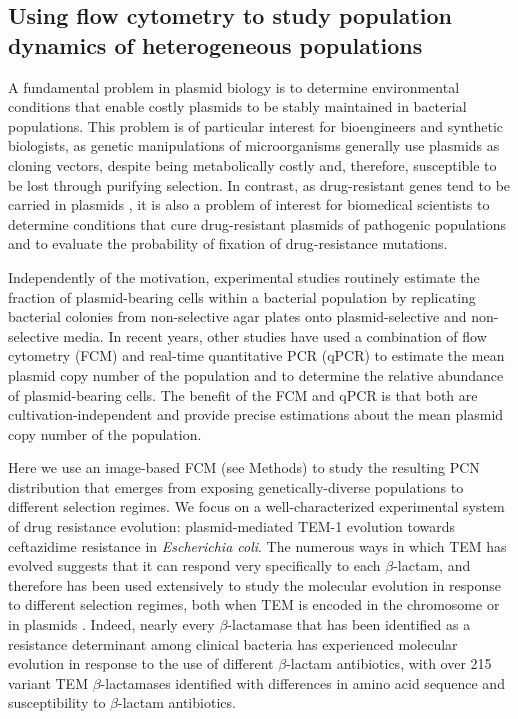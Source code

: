 \documentclass[fleqn,12pt]{wlscirep}
\begin{document}


\subsection{Using flow cytometry to study population dynamics of heterogeneous populations}
A fundamental problem in plasmid biology is to determine environmental conditions that enable costly plasmids to be stably maintained in bacterial populations\cite{Harrison2015,loftie2016evolutionary,porse2016survival}. This problem is of particular interest for bioengineers and synthetic biologists, as genetic manipulations of microorganisms generally use plasmids as cloning vectors, despite being metabolically costly and, therefore, susceptible to be lost through purifying selection.  In contrast, as drug-resistant genes tend to be carried in plasmids \cite{alekshun2007molecular,san2018evolution}, it is also a problem of interest for biomedical scientists to determine conditions that cure drug-resistant plasmids of pathogenic populations\cite{boucher2009bad} and to evaluate the probability of fixation of drug-resistance mutations\cite{Ilhan2019,Rodriguez2018}.  

Independently of the motivation, experimental studies routinely estimate the fraction of plasmid-bearing cells within a bacterial population by replicating bacterial colonies from non-selective agar plates onto plasmid-selective and non-selective media. 
In recent years, other studies have used a combination of flow cytometry (FCM) and real-time quantitative PCR (qPCR) to estimate the mean plasmid copy number of the population\cite{ng2010plasmid} and to determine the relative abundance of plasmid-bearing cells\cite{bahl2004quantification}.  The benefit of the FCM and qPCR is that both are cultivation-independent and provide precise estimations about the mean plasmid copy number of the population. 

Here we use an image-based FCM (see Methods) to study the resulting PCN distribution that emerges from exposing genetically-diverse populations to different selection regimes. We focus on a well-characterized experimental system of drug resistance evolution: plasmid-mediated TEM-1 evolution towards ceftazidime resistance in {\em Escherichia coli}. The numerous ways in which TEM has evolved suggests that it can respond very specifically to each $\beta$-lactam, and therefore has been used extensively to study the molecular evolution in response to different selection regimes, both when TEM is encoded in the chromosome \cite{Barlow2002, Barlow2003} or in plasmids \cite{Rodriguez2018,santos2017naturally}.  
Indeed, nearly every $\beta$-lactamase that has been identified as a resistance determinant among clinical bacteria has experienced molecular evolution in response to the use of different $\beta$-lactam antibiotics, with over 215 variant TEM $\beta$-lactamases identified with differences in amino acid sequence and susceptibility to $\beta$-lactam antibiotics\cite{Barlow2002}.
\end{document}
